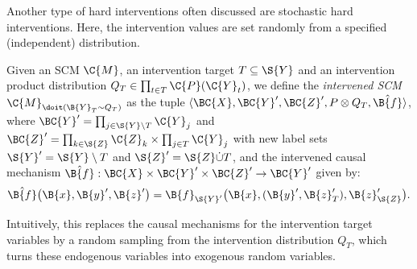 Another type of hard interventions often discussed are stochastic hard interventions. Here, the intervention
values are set randomly from a specified (independent) distribution.
\begin{Def}\label{def:intervened_scm_stochastic}
  Given an SCM $\C{M}$, an intervention target $T \subseteq \S{Y}$ 
  and an intervention product distribution $Q_T \in \prod_{t\in T} \C{P}(\C{Y}_t)$, we define the \emph{intervened SCM
  $\C{M}_{\doit(\B{Y}_T\sim Q_T)}$} as the tuple 
  $\langle \BC{X},\BC{Y}',\BC{Z}',P \otimes Q_T,\hat{\B{f}} \rangle$,
  where $\BC{Y}' = \prod_{j\in\S{Y}\setminus T} \C{Y}_j$ and
  $\BC{Z}' = \prod_{k\in\S{Z}} \C{Z}_k \times \prod_{j\in T} \C{Y}_j$
  with new label sets $\S{Y}' = \S{Y}\setminus T$ and $\S{Z}' = \S{Z} \dot\cup T$, 
  and the intervened causal mechanism
  $\hat{\B{f}} : \BC{X} \times \BC{Y}' \times \BC{Z}' \to \BC{Y}'$ given by:
  $$\hat{\B{f}}\big(\B{x},\B{y}',\B{z}'\big) = \B{f}_{\S{Y}'}\big(\B{x},(\B{y}',\B{z}'_T),\B{z}'_{\S{Z}}\big).$$
\end{Def}
Intuitively, this replaces the causal mechanisms for the intervention target variables
by a random sampling from the intervention distribution $Q_T$, which turns these endogenous
variables into exogenous random variables.

